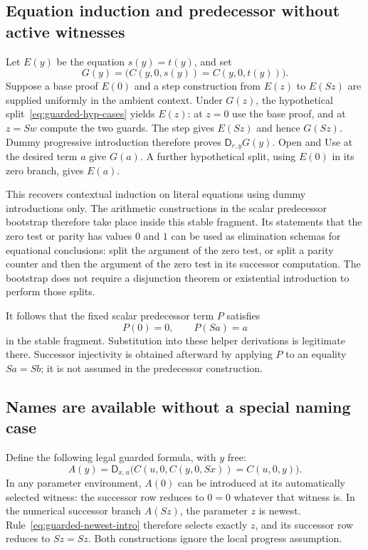 \subsection{Equation induction and predecessor without active witnesses}

Let $E(y)$ be the equation $s(y)=t(y)$, and set
\[
 G(y)=\bigl(C(y,0,s(y))=C(y,0,t(y))\bigr).
\]
Suppose a base proof $E(0)$ and a step construction from $E(z)$ to
$E(Sz)$ are supplied uniformly in the ambient context.  Under $G(z)$,
the hypothetical split~\eqref{eq:guarded-hyp-cases} yields $E(z)$:
at $z=0$ use the base proof, and at $z=Sw$ compute the two guards.
The step gives $E(Sz)$ and hence $G(Sz)$.  Dummy progressive
introduction therefore proves $\mathsf D_{r,y}G(y)$.  Open and Use
at the desired term $a$ give $G(a)$.  A further hypothetical split,
using $E(0)$ in its zero branch, gives $E(a)$.

This recovers contextual induction on literal equations using dummy
introductions only.  The arithmetic constructions in the scalar
predecessor bootstrap therefore take place inside this stable fragment.
Its statements that the zero test or parity has values $0$ and $1$
can be used as elimination schemas for equational conclusions: split
the argument of the zero test, or split a parity counter and then
the argument of the zero test in its successor computation.  The
bootstrap does not require a disjunction theorem or existential
introduction to perform those splits.

It follows that the fixed scalar predecessor term $P$ satisfies
\[
                  P(0)=0,\qquad P(Sa)=a
\]
in the stable fragment.  Substitution into these helper derivations
is legitimate there.  Successor injectivity is obtained afterward by
applying $P$ to an equality $Sa=Sb$; it is not assumed in the
predecessor construction.

\subsection{Names are available without a special naming case}

Define the following legal guarded formula, with $y$ free:
\[
 A(y)=\mathsf D_{x,u}
 \bigl(C(u,0,C(y,0,Sx))=C(u,0,y)\bigr).
 \tag{N}\label{eq:guarded-naming-family}
\]
In any parameter environment, $A(0)$ can be introduced at its
automatically selected witness: the successor row reduces to $0=0$
whatever that witness is.  In the numerical successor branch
$A(Sz)$, the parameter $z$ is newest.  Rule~\eqref{eq:guarded-newest-intro}
therefore selects exactly $z$, and its successor row reduces to
$Sz=Sz$.  Both constructions ignore the local progress assumption.

